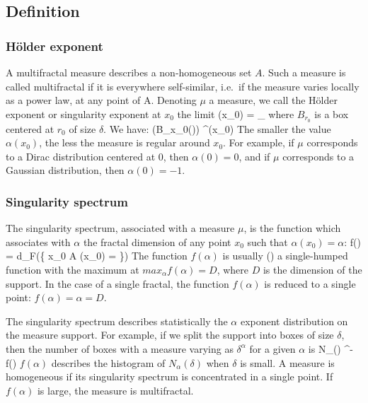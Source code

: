 \subsection{Definition}
\subsubsection*{H\"older exponent}
A multifractal measure describes a non-homogeneous set $A$. 
Such a measure is called multifractal if it is everywhere self-similar, i.e.\
if the measure varies locally as a power law, at any point of A. 
Denoting $\mu$ a measure, we call the H\"older exponent or singularity exponent
at $x_0$  the limit
\be
\alpha(x_0) =  \lim_{\delta {}} {  
            \over \ln{\delta} }
\ee
where $B_{r_0}$ is a box centered at $r_0$ of size $\delta$.
We have:
\be
\mu(B_{x_0}(\delta)) \propto \delta^{\alpha(x_0)}
\ee
The smaller the value $\alpha(x_0)$, the less the measure is regular around
$x_0$. For example, if $\mu$ corresponds to a Dirac distribution centered 
at $0$, 
then $\alpha(0) = 0$, and if $\mu$ corresponds to a Gaussian distribution, then
$\alpha(0) = -1$.

\subsubsection*{Singularity spectrum}

The singularity spectrum, associated with a measure $\mu$, is the function
which associates with $\alpha$ the fractal dimension of 
any point $x_0$ such that
$\alpha(x_0) = \alpha$:
\be
f(\alpha) = d_F(\{ x_0 \in A \mid \alpha(x_0) = \alpha \})
\ee
 The function $f(\alpha)$ is usually (\cite{frac:paladin86})
a single-humped
function with the maximum at $max_{\alpha} f(\alpha) = D$, 
where $D$ is the dimension of the support. In the case
of a single fractal, the function $f(\alpha)$ is reduced to
a single point: $f(\alpha) = \alpha = D$.

The singularity spectrum describes statistically the $\alpha$ exponent
distribution on the measure support. For example, if we split the
support into boxes of size $\delta$, then the number of boxes with a
measure varying as $\delta^\alpha$ for a given $\alpha$ is
\be
N_\alpha(\delta) \propto \delta^{-f(\alpha)}
\ee
$f(\alpha)$ describes the histogram of $N_\alpha(\delta)$ when
$\delta$ is small. A measure is homogeneous if its singularity spectrum
is concentrated in a single point. If $f(\alpha)$ is large, the
measure is multifractal.

